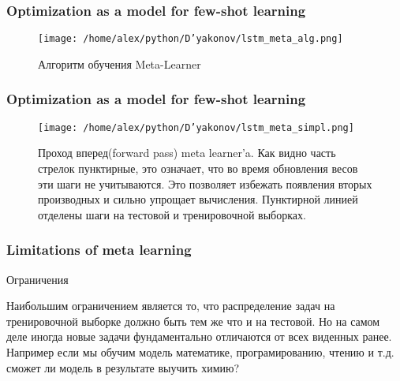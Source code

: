 \documentclass[fleqn, xcolor=x11names]{beamer}
\begin{document}
\begin{frame}\frametitle{Optimization as a model for few-shot learning}

\begin{figure}[h]
\begin{center}
\texttt{[image: /home/alex/python/D'yakonov/lstm\_meta\_alg.png]}
\caption{{\footnotesize  Алгоритм обучения Meta-Learner}}
\end{center}
\end{figure}

\end{frame}

\begin{frame}\frametitle{Optimization as a model for few-shot learning}
\begin{figure}[h]
\begin{center}
\texttt{[image: /home/alex/python/D'yakonov/lstm\_meta\_simpl.png]}
\caption{{\footnotesize  Проход вперед(forward pass) meta learner'a. Как видно часть стрелок пунктирные, это означает, что во время обновления весов эти шаги не учитываются. Это позволяет избежать появления вторых производных и сильно упрощает вычисления. Пунктирной линией отделены шаги на тестовой и тренировочной выборках.}}
\end{center}
\end{figure}
\end{frame}

\begin{frame}\frametitle{Limitations of meta learning}

\begin{block}{Ограничения}

Наибольшим ограничением является то, что распределение задач на тренировочной выборке должно быть тем же что и на тестовой.
Но на самом деле иногда новые задачи фундаментально отличаются от всех виденных ранее. Например если мы обучим модель математике, програмированию, чтению и т.д. сможет ли модель в результате выучить химию?

\end{block}

\end{frame}
\end{document}
